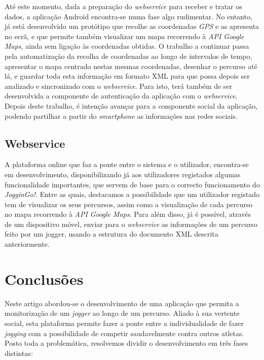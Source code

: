 \documentclass[twocolumn,twoside,10pt,a4paper]{article}
\begin{document}
Até este momento, dada a preparação do \textit{webservice} para receber e tratar os dados, a aplicação Android encontra-se numa fase algo rudimentar. No entanto, já está desenvolvido um protótipo que recolhe as coordenadas \textit{GPS} e as apresenta no ecrã, e que permite também visualizar um mapa recorrendo à \emph{API Google Maps}, ainda sem ligação às coordenadas obtidas.
O trabalho a continuar passa pela automatização da recolha de coordenadas ao longo de intervalos de tempo, apresentar o mapa centrado nestas mesmas coordenadas, desenhar o percurso até lá, e guardar toda esta informação em formato XML para que possa depois ser analizado e sincronizado com o  \textit{webservice}. Para isto, terá também de ser desenvolvida a componente de autenticação da aplicação com o  \textit{webservice}.
Depois deste trabalho, é intenção avançar para a componente social da aplicação, podendo partilhar a partir do  \textit{smartphone} as informações nas redes sociais.

\subsection{Webservice}

A plataforma online que faz a ponte entre o sistema e o utilizador, encontra-se em desenvolvimento, disponibilizando já aos utilizadores registados algumas funcionalidade importantes, que servem de base para o correcto funcionamento do \textit{JogginGo!}. Entre as quais, destacamos a possibilidade que um utilizador registado tem de visualizar os seus percursos, assim como a visualização de cada percurso no mapa  recorrendo à \emph{API Google Maps}. Para além disso, já é possível, através de um dispositivo móvel, enviar para o \textit{webservice} as informações de um percurso feito por um jogger, usando a estrutura do documento XML descrita anteriormente.


\section{Conclusões}\label{sec:conclusions}

Neste artigo abordou-se o desenvolvimento de uma aplicação que permita a monitorização de um \textit{jogger} ao longo de um percurso. Aliado à sua vertente social, esta plataforma permite fazer a ponte entre a individualidade de fazer \textit{jogging} com a possibilidade de competir saudavelmente contra outros atletas.
Posto toda a problemática, resolvemos dividir o desenvolvimento em três fases distintas:
\end{document}
